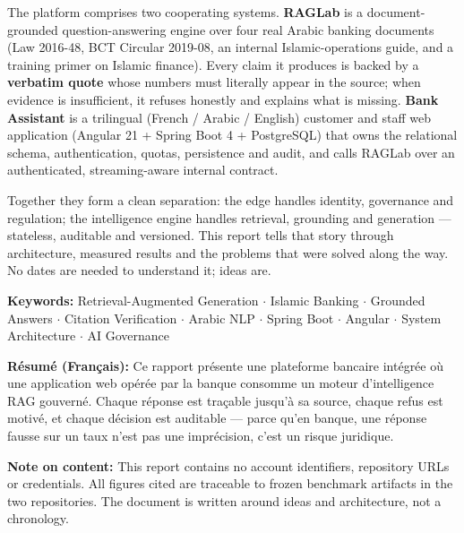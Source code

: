 \documentclass[a4paper,12pt]{report}
\begin{document}
The platform comprises two cooperating systems. \textbf{RAGLab} is a document-grounded question-answering engine over four real Arabic banking documents (Law 2016-48, BCT Circular 2019-08, an internal Islamic-operations guide, and a training primer on Islamic finance). Every claim it produces is backed by a \textbf{verbatim quote} whose numbers must literally appear in the source; when evidence is insufficient, it refuses honestly and explains what is missing. \textbf{Bank Assistant} is a trilingual (French / Arabic / English) customer and staff web application (Angular 21 + Spring Boot 4 + PostgreSQL) that owns the relational schema, authentication, quotas, persistence and audit, and calls RAGLab over an authenticated, streaming-aware internal contract.

Together they form a clean separation: the edge handles identity, governance and regulation; the intelligence engine handles retrieval, grounding and generation --- stateless, auditable and versioned. This report tells that story through architecture, measured results and the problems that were solved along the way. No dates are needed to understand it; ideas are.

\vspace{0.4cm}
\noindent\textbf{Keywords:} {\small Retrieval-Augmented Generation $\cdot$ Islamic Banking $\cdot$ Grounded Answers $\cdot$ Citation Verification $\cdot$ Arabic NLP $\cdot$ Spring Boot $\cdot$ Angular $\cdot$ System Architecture $\cdot$ AI Governance}

\vspace{0.35cm}
\noindent\textbf{Résumé (Français):} {\small Ce rapport présente une plateforme bancaire intégrée où une application web opérée par la banque consomme un moteur d'intelligence RAG gouverné. Chaque réponse est traçable jusqu'à sa source, chaque refus est motivé, et chaque décision est auditable --- parce qu'en banque, une réponse fausse sur un taux n'est pas une imprécision, c'est un risque juridique.}

\vspace{0.35cm}
\noindent\textbf{Note on content:} {\footnotesize\color{textDark!75} This report contains no account identifiers, repository URLs or credentials. All figures cited are traceable to frozen benchmark artifacts in the two repositories. The document is written around ideas and architecture, not a chronology.}

\clearpage
\tableofcontents
\clearpage
\end{document}
